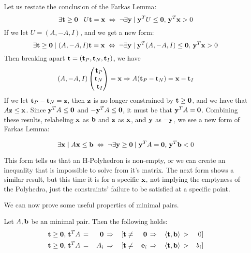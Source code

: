 Let us restate the conclusion of the Farkas Lemma:
\newcommand{\xor}{\;\Leftrightarrow\;\neg}
\[ \exists \t\geq\0 \st U\t = \x \xor \exists \y\st \y^TU\leq\0,\, \y^T\x > 0 \]
If we let $U = (A,-A,I)$, and  we get a new form:
\[ \exists \t \geq\0 \st (A,-A,I)\t = \x \xor \exists \y\st \y^T(A,-A,I)\leq\0,\, \y^T\x > 0 \]
Then breaking apart $\mathbf{t} = (\mathbf{t}_P,\mathbf{t}_N,\mathbf{t}_I)$, we have
\[ (A,-A,I)\pmb \t_P\\ \t_N\\ \t_I \pme = \x \Rightarrow A(\t_P - \t_N) = \x - \t_I \]
If we let $\mathbf{t}_P - \mathbf{t}_N = \mathbf{z}$, then $\mathbf{z}$ is no longer constrained by $\mathbf{t} \geq\mathbf{0}$, and we have that $A\mathbf{z} \leq \mathbf{x}$.  Since $\mathbf{y}^T A \leq \mathbf{0}$ and $-\mathbf{y}^T A\leq \mathbf{0}$, it must be that $\mathbf{y}^T A = \mathbf{0}$.  Combining these results, relabeling $\mathbf{x}$ as $\mathbf{b}$ and $\mathbf{z}$ as $\mathbf{x}$, and $\mathbf{y}$ as $-\mathbf{y}$, we see a new form of Farkas Lemma:
\begin{Thm}\label{FL2}
	\[ \exists \x \st A\x \leq \b \xor \exists \y\geq\0 \st \y^TA = \0,\, \y^T\b < 0 \]
\end{Thm}
This form tells us that an H-Polyhedron is non-empty, or we can create an inequality that is impossible to solve from it's matrix.  The next form shows a similar result, but this time it is for a specific $\mathbf{x}$, not implying the emptyness of the Polyhedra, just the constraints' failure to be satisfied at a specific point.
%
%

We can now prove some useful properties of minimal pairs.

\begin{Prop}\label{minimal_Ab_pair_properties}
	Let $A,\mathbf{b}$ be an minimal pair.  Then the following holds:
	\begin{alignat*}{6}
		\mathbf{t}\geq\mathbf{0},\,\mathbf{t}^T A \, & = & \, \mathbf{0}  \, & \Rightarrow & \, [\mathbf{t} & \neq & \, \mathbf{0} \,   & \Rightarrow & \, \left\langle \mathbf{t}, \mathbf{b} \right\rangle \, & > & \, 0 ]   \\
		\mathbf{t}\geq\mathbf{0},\,\mathbf{t}^T A \, & = & \, A_i \, & \Rightarrow & \, [\mathbf{t} & \neq & \, \mathbf{e}_i \, & \Rightarrow & \, \left\langle \mathbf{t}, \mathbf{b} \right\rangle \, & > & \, b_i ]
	\end{alignat*}
\end{Prop}

